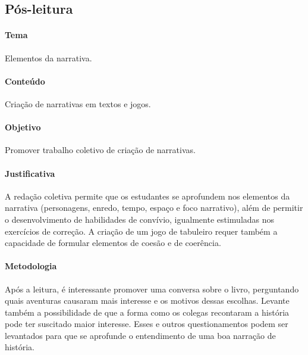 \documentclass[11pt]{extarticle}
\begin{document}
\subsection{Pós-leitura}


\paragraph{Tema} Elementos da narrativa.

\paragraph{Conteúdo} Criação de narrativas em textos e jogos.  

\paragraph{Objetivo} Promover trabalho coletivo de criação de narrativas.  

\paragraph{Justificativa} A redação coletiva permite que os estudantes se aprofundem nos elementos da narrativa (personagens, enredo, tempo, espaço e foco narrativo), além de permitir o desenvolvimento de habilidades de convívio, igualmente estimuladas nos exercícios de correção. A criação de um jogo de tabuleiro requer também a capacidade de formular elementos de coesão e de coerência. 

\paragraph{Metodologia} Após a leitura, é interessante promover uma conversa sobre o livro, perguntando quais aventuras causaram mais interesse e os motivos dessas escolhas. Levante também a possibilidade de que a forma como os colegas recontaram a história pode ter suscitado maior interesse. Esses e outros questionamentos podem ser levantados para que se aprofunde o entendimento de uma boa narração de história. 
\end{document}
